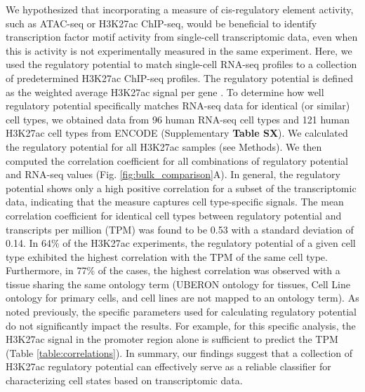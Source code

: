 We hypothesized that incorporating a measure of cis-regulatory element activity, such as ATAC-seq or H3K27ac ChIP-seq, would be beneficial to identify transcription factor motif activity from single-cell transcriptomic data, even when this is activity is not experimentally measured in the same experiment. Here, we used the regulatory potential to match single-cell RNA-seq profiles to a collection of predetermined H3K27ac ChIP-seq profiles. The regulatory potential is defined as the weighted average H3K27ac signal per gene \cite{Wang2016}. To determine how well regulatory potential specifically matches RNA-seq data for identical (or similar) cell types, we obtained data from 96 human RNA-seq cell types and 121 human H3K27ac cell types from ENCODE\cite{encode_dcc} (Supplementary \textbf{Table SX}). We calculated the regulatory potential for all H3K27ac samples (see Methods). We then computed the correlation coefficient for all combinations of regulatory potential and RNA-seq values (Fig. \ref{fig:bulk_comparison}A). In general, the regulatory potential shows only a high positive correlation for a subset of the transcriptomic data, indicating that the measure captures cell type-specific signals. The mean correlation coefficient for identical cell types between regulatory potential and transcripts per million (TPM) was found to be 0.53 with a standard deviation of 0.14. In 64\% of the H3K27ac experiments, the regulatory potential of a given cell type exhibited the highest correlation with the TPM of the same cell type. Furthermore, in 77\% of the cases, the highest correlation was observed with a tissue sharing the same ontology term (UBERON ontology for tissues, Cell Line ontology for primary cells, and cell lines are not mapped to an ontology term). As noted previously\cite{Wang2016}, the specific parameters used for calculating regulatory potential do not significantly impact the results. For example, for this specific analysis, the H3K27ac signal in the promoter region alone is sufficient to predict the TPM (Table \ref{table:correlations}). In summary, our findings suggest that a collection of H3K27ac regulatory potential can effectively serve as a reliable classifier for characterizing cell states based on transcriptomic data.

